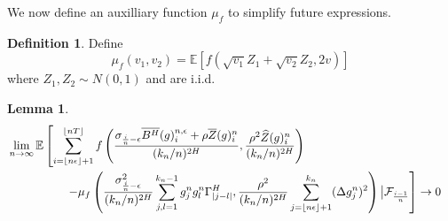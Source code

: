 \documentclass[12pt,letterpaper]{article}
\newtheorem{lemma}{Lemma}
\theoremstyle{definition}
\newtheorem*{definition}{Definition}
\newcommand{\E}{\mathbb{E}}
\begin{document}
We now define an auxilliary function \(\mu_{f}\) to simplify future expressions.
\begin{definition}
  Define
  \begin{equation}
    \mu_f(v_1, v_2) = \E\left[ f(\sqrt{v_1}Z_1 + \sqrt{v_2}Z_2, 2v) \right]
  \end{equation}
  where \(Z_1, Z_2 \sim N(0,1)\) and are i.i.d.
\end{definition}

\begin{lemma}
  \begin{align}
    \phantom{}
    &\begin{aligned}
      \mathllap{} &\lim_{n \rightarrow \infty} \E\left[ \sum_{i=\lfloor n\epsilon \rfloor + 1}^{\lfloor nT \rfloor}f\left( \frac{\sigma_{\frac{i}{n}-\epsilon}\overline{B^H}(g)^{n,\epsilon}_i + \rho\overline{Z}(g)^n_i}{(k_n/n)^{2H}}, \frac{\rho^2\widehat{Z}(g)^n_i}{(k_n/n)^{2H}}\right) \right. \\
                  &\hspace*{1.75cm} \left. - \mu_f\left( \frac{\sigma^2_{\frac{i}{n}-\epsilon}}{(k_n/n)^{2H}}\sum_{j,l = 1}^{k_n-1} g^n_jg^n_l\Gamma^H_{|j-l|}, \frac{\rho^2}{(k_n/n)^{2H}}\sum_{j=\lfloor n\epsilon \rfloor + 1}^{k_n}(\Delta g^n_j)^2 \right)\big| \mathcal{F}_{\frac{i-1}{n}} \right] \rightarrow 0
    \end{aligned}
  \end{align}
\end{lemma}
\end{document}

